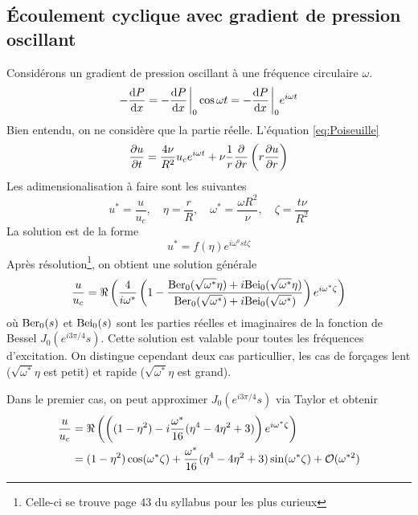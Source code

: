     \subsection{Écoulement cyclique avec gradient de pression oscillant}
      Considérons un gradient de pression oscillant à une fréquence circulaire $\omega$.
      \begin{equation}
        -\dv{P}{x} = -\dv{P}{x}\eval_0 \cos{\omega t} = -\dv{P}{x}\eval_0 e^{i\omega t}
      \end{equation}
      Bien entendu, on ne considère que la partie réelle. L'équation \ref{eq:Poiseuille}
      \begin{equation}
        \pdv{u}{t} = \frac{4\nu}{R^2} u_c e^{i\omega t} + \nu \frac{1}{r}\pdv{r} \left(r\pdv{u}{r}\right)
      \end{equation}
      Les adimensionalisation à faire sont les suivantes
      \begin{equation}
        u^\ast = \frac{u}{u_c}, \quad \eta = \frac{r}{R}, \quad \omega^\ast = \frac{\omega R^2}{\nu}, \quad \zeta = \frac{t\nu}{R^2}
      \end{equation}
      La solution est de la forme
      \begin{equation}
        u^\ast = f(\eta) e^{i\omega^ast \zeta}
      \end{equation}
      Après résolution\footnote{Celle-ci se trouve page 43 du syllabus pour les plus curieux}, on obtient une solution générale
      \begin{equation}
        \frac{u}{u_c} = \real \left( \frac{4}{i\omega^\ast} \left( 1 - \frac{\Ber_0(\sqrt{\omega^\ast} \eta) + i \Bei_0(\sqrt{\omega^\ast} \eta)}{\Ber_0(\sqrt{\omega^\ast}) + i \Bei_0(\sqrt{\omega^\ast})} \right) e^{i\omega^\ast \zeta}\right)
      \end{equation}
      où $\textrm{Ber}_0(s)$ et $\textrm{Bei}_0(s)$ sont les parties réelles et imaginaires de la fonction de Bessel $J_0(e^{i3\pi/4}s)$. Cette solution est valable pour toutes les fréquences d'excitation. On distingue cependant deux cas particullier, les cas de forçages lent ($\sqrt{\omega^\ast}\eta$ est petit) et rapide ($\sqrt{\omega^\ast}\eta$ est grand).

      Dans le premier cas, on peut approximer $J_0(e^{i3\pi/4}s)$ via Taylor et obtenir
      \begin{equation}
        \begin{aligned}
          \frac{u}{u_c} &= \real \left(\left((1-\eta^2) - i \frac{\omega^\ast}{16} (\eta^4 - 4 \eta^2 +3) \right)e^{i\omega^\ast \zeta}\right)\\
          &= (1- \eta^2) \cos(\omega^\ast \zeta) + \frac{\omega^\ast}{16} (\eta^4 - 4 \eta^2 +3) \sin (\omega^\ast \zeta) + \mathcal{O}(\omega^{\ast2})
        \end{aligned}
      \end{equation}

